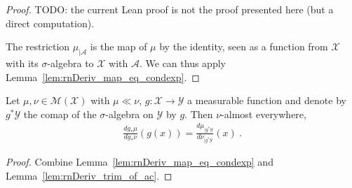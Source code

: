 \begin{proof}\leanok
{}
TODO: the current Lean proof is not the proof presented here (but a direct computation).

The restriction $\mu_{| \mathcal A}$ is the map of $\mu$ by the identity, seen as a function from $\mathcal X$ with its $\sigma$-algebra to $\mathcal X$ with $\mathcal{A}$.
We can thus apply Lemma~\ref{lem:rnDeriv_map_eq_condexp}.
\end{proof}


\begin{lemma}
  \label{lem:rnDeriv_map_eq_rnDeriv_trim}
  \uses{}
  Let $\mu, \nu \in \mathcal M(\mathcal X)$ with $\mu \ll \nu$, $g : \mathcal X \to \mathcal Y$ a measurable function and denote by $g^* \mathcal Y$ the comap of the $\sigma$-algebra on $\mathcal Y$ by $g$.
  Then $\nu$-almost everywhere,
  \begin{align*}
  \frac{d g_*\mu}{d g_*\nu}(g(x)) = \frac{d \mu_{| g^* \mathcal Y}}{d \nu_{| g^* \mathcal Y}}(x)
  \: .
  \end{align*}
\end{lemma}

\begin{proof}%
{}
Combine Lemma~\ref{lem:rnDeriv_map_eq_condexp} and Lemma~\ref{lem:rnDeriv_trim_of_ac}.
\end{proof}